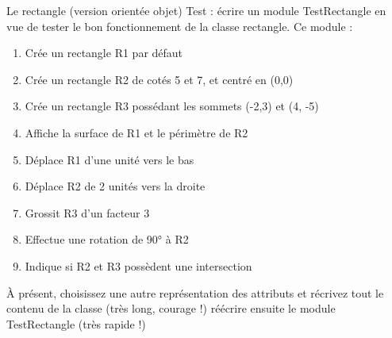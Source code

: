 \begin{Exercice}{Le rectangle (version orientée objet)}
	Test : écrire un module TestRectangle en vue de tester le bon
	fonctionnement de la classe rectangle. Ce module : 

	\begin{enumerate}[label=\alph*)]
		\item 
			Crée un rectangle R1 par défaut
		\item 
			Crée un rectangle R2 de cotés 5 et 7, et centré en (0,0)
		\item 
			Crée un rectangle R3 possédant les sommets (-2,3) et (4, -5)
		\item 
			Affiche la surface de R1 et le périmètre de R2
		\item 
			Déplace R1 d’une unité vers le bas
		\item 
			Déplace R2 de 2 unités vers la droite
		\item 
			Grossit R3 d’un facteur 3
		\item 
			Effectue une rotation de 90° à R2
		\item 
			Indique si R2 et R3 possèdent une intersection
	\end{enumerate}

	À présent, choisissez une autre représentation des attributs et récrivez
	tout le contenu de la classe (très long, courage !) réécrire ensuite le
	module TestRectangle (très rapide !)
\end{Exercice}
